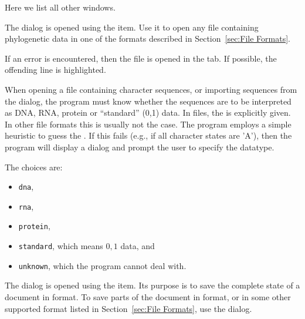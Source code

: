 \documentclass[11pt]{article}
\begin{document}

Here we list all other windows.


The  dialog is opened using the
 item.
Use it to open any file containing phylogenetic data in
one of the formats described in Section~\ref{sec:File Formats}.

If an error is encountered,
then the file is opened in the  tab.
If possible, the offending line is highlighted.


When opening a file containing character sequences, or importing sequences
from the  dialog, the program must know whether
the sequences are to be interpreted as DNA, RNA, protein or ``standard'' (0,1)
data.
In  files, the  is explicitly given.
In other file formats this is usually not the case.
The program employs a simple heuristic to guess the .
If this fails (e.g., if all character states are 'A'),
then the program will display
a  dialog and prompt the user to specify the datatype.

The choices are:
\begin{itemize}
\item {\tt dna},
\item {\tt rna},
\item {\tt protein},
\item {\tt standard}, which means $0,1$ data, and
\item {\tt unknown}, which the program cannot deal with.
\end{itemize}


The  dialog is opened using the
 item. Its purpose is to save the complete
state of a document in  format.
To save parts of the document in  format, or in some other
supported format listed in Section~\ref{sec:File Formats}, use
the  dialog.


\end{document}
